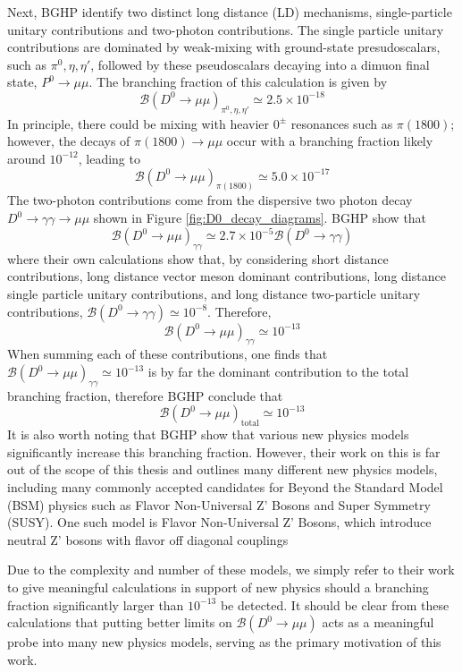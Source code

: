 Next, BGHP identify two distinct long distance (LD) mechanisms, single-particle unitary contributions and two-photon contributions. The single particle unitary contributions are dominated by weak-mixing with ground-state presudoscalars, such as $\pi^0, \eta, \eta'$, followed by these pseudoscalars decaying into a dimuon final state, $P^0 \to \mu \mu$. The branching fraction of this calculation is given by
\begin{equation}
\mathcal{B}(D^0 \to \mu \mu)_{\pi^0, \eta, \eta'} \simeq 2.5 \times 10^{-18}
\end{equation}
In principle, there could be mixing with heavier $0^\pm$ resonances such as $\pi(1800)$; however, the decays of $\pi(1800) \to \mu\mu$ occur with a branching fraction likely around $10^{-12}$, leading to
\begin{equation}
\mathcal{B}(D^0 \to \mu \mu)_{\pi(1800)} \simeq  5.0 \times 10^{-17}
\end{equation}
The two-photon contributions come from the dispersive two photon decay $D^0 \to \gamma \gamma \to \mu \mu$ shown in Figure \ref{fig:D0_decay_diagrams}. BGHP show that 
\begin{equation}
\mathcal{B}(D^0 \to \mu \mu)_{\gamma\gamma} \simeq 2.7 \times 10^{-5} \mathcal{B}(D^0 \to \gamma\gamma)
\end{equation}
where their own calculations show that, by considering short distance contributions, long distance vector meson dominant contributions, long distance single particle unitary contributions, and long distance two-particle unitary contributions, $\mathcal{B}(D^0 \to \gamma\gamma) \simeq 10^{-8}$. Therefore, 
\begin{equation}
\mathcal{B}(D^0 \to \mu \mu)_{\gamma\gamma} \simeq 10^{-13}
\end{equation}
When summing each of these contributions, one finds that $\mathcal{B}(D^0 \to \mu \mu)_{\gamma\gamma} \simeq 10^{-13}$ is by far the dominant contribution to the total branching fraction, therefore BGHP conclude that
\begin{equation}
\mathcal{B}(D^0 \to \mu \mu)_{\text{total}} \simeq 10^{-13}
\end{equation}
It is also worth noting that BGHP show that various new physics models significantly increase this branching fraction. However, their work on this is far out of the scope of this thesis and outlines many different new physics models, including many commonly accepted candidates for Beyond the Standard Model (BSM) physics such as Flavor Non-Universal Z' Bosons and Super Symmetry (SUSY). One such model is Flavor Non-Universal Z' Bosons, which introduce neutral Z' bosons with flavor off diagonal couplings 

Due to the complexity and number of these models, we simply refer to their work to give meaningful calculations in support of new physics should a branching fraction significantly larger than $10^{-13}$ be detected. It should be clear from these calculations that putting better limits on $\mathcal{B}(D^0 \to \mu \mu)$ acts as a meaningful probe into many new physics models, serving as the primary motivation of this work. 